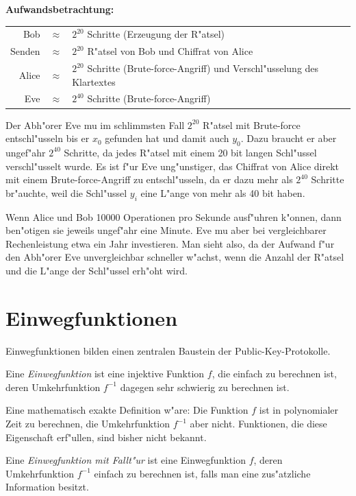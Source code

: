 {\bf Aufwandsbetrachtung: } \\
\begin{tabular}{rcl}
  Bob          & $\approx$ & $2^{20}$ Schritte (Erzeugung der R"atsel) \\
  Senden       & $\approx$ & $2^{20}$ R"atsel von Bob und Chiffrat von Alice\\
  Alice        & $\approx$ & $2^{20}$ Schritte (Brute-force-Angriff) und 
                 Verschl"usselung des Klartextes\\
  Eve          & $\approx$ & $2^{40}$ Schritte (Brute-force-Angriff)
\end{tabular} 

Der Abh"orer Eve mu\3 im schlimmsten Fall $2^{20}$ R"atsel mit
Brute-force entschl"usseln bis er $x_0$ gefunden hat und damit auch
$y_0$. Dazu braucht er aber ungef"ahr $2^{40}$ Schritte, da jedes
R"atsel mit einem 20 bit langen Schl"ussel verschl"usselt wurde.
Es ist f"ur Eve ung"unstiger, das Chiffrat von Alice direkt mit einem
Brute-force-Angriff zu entschl"usseln, da er dazu mehr als
$2^{40}$ Schritte br"auchte, weil die Schl"ussel $y_i$ eine L"ange von mehr als
40 bit haben.

Wenn Alice und Bob 10000 Operationen pro Sekunde ausf"uhren k"onnen, dann
ben"otigen sie jeweils ungef"ahr eine Minute. Eve mu\3 aber bei
vergleichbarer Rechenleistung etwa ein Jahr investieren. Man sieht
also, da\3 der Aufwand f"ur den Abh"orer Eve unvergleichbar schneller
w"achst, wenn die Anzahl der R"atsel und die L"ange der Schl"ussel erh"oht
wird.

\section{Einwegfunktionen}

Einwegfunktionen bilden einen zentralen Baustein der Public-Key-Protokolle. 

\begin{definition}[Einwegfunktion]
Eine {\em Einwegfunktion} ist eine injektive Funktion $f$, die einfach zu
berechnen ist, deren Umkehrfunktion $f^{-1}$ dagegen sehr schwierig zu
berechnen ist.
\end{definition}

Eine mathematisch exakte Definition w"are: Die Funktion $f$ ist in
polynomialer Zeit zu berechnen, die Umkehrfunktion $f^{-1}$ aber
nicht. Funktionen, die diese Eigenschaft erf"ullen, sind bisher
nicht bekannt.

\begin{definition} 
Eine {\em Einwegfunktion mit Fallt"ur} ist eine Einwegfunktion $f$,
deren Umkehrfunktion $f^{-1}$ einfach zu berechnen ist, falls man eine
zus"atzliche Information besitzt.
\end{definition}

